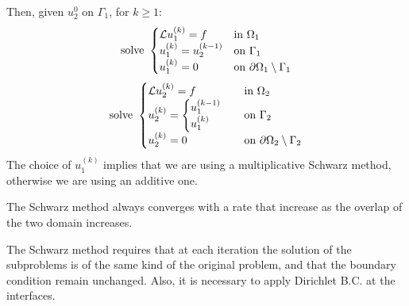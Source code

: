 Then, given \(u_2^0\) on \(\Gamma_1\), for \(k \geq 1\):
\begin{equation*}
    \text{solve }\begin{cases}
        \mathcal{L} u^{(k)}_1 = f & \text{in } \Omega_1 \\
        u^{(k)}_1 = u^{(k-1)}_2 & \text{on } \Gamma_1 \\
        u^{(k)}_1 = 0 & \text{on } {\partial\Omega}_1\setminus \Gamma_1
    \end{cases}
\end{equation*}
\begin{equation*}
    \text{solve }\begin{cases}
        \mathcal{L} u^{(k)}_2 = f & \text{in } \Omega_2 \\
        u^{(k)}_2 = \begin{cases}
            u^{(k-1)}_1 \\
            u^{(k)}_1 
        \end{cases} & \text{on } \Gamma_2 \\
        u^{(k)}_2 = 0 & \text{on } {\partial\Omega}_2\setminus \Gamma_2
    \end{cases}
\end{equation*}
The choice of \(u^{(k)}_1\) implies that we are using a multiplicative Schwarz method, otherwise we are using an additive one.

The Schwarz method always converges with a rate that increase as the overlap of the two domain increases.
\begin{remark}
    The Schwarz method requires that at each iteration the solution of the subproblems is of the same kind of the original problem, and that the boundary condition remain unchanged. Also, it is necessary to apply Dirichlet B.C. at the interfaces.
\end{remark}
